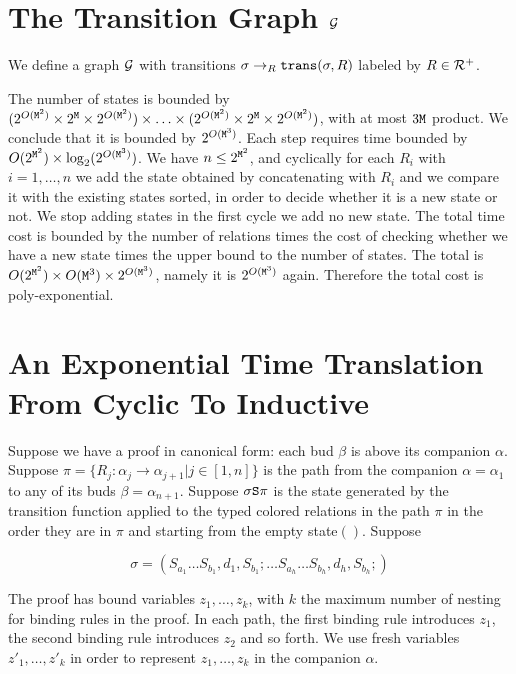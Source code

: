 \documentclass{lmcs}
\begin{document}
\section{The Transition Graph ${\mathcal G}$}
We define a graph ${\mathcal G}$ with transitions $\sigma \rightarrow_R {\tt trans}(\sigma,R)$ labeled
by $R \in {\mathcal R}^+$.


The number of states is bounded by 
$
(2^{O({\tt M}^2)} \times 2^{\tt M} \times 2^{O({\tt M}^2)})
\times \ldots \times
(2^{O({\tt M}^2)} \times 2^{\tt M} \times 2^{O({\tt M}^2)})
$,
with at most $3{\tt M}$ product. 
We conclude that it is bounded by $2^{O({\tt M}^3)}$. Each step requires time bounded by
$O(2^{{\tt M}^2}) \times \log_2(2^{O({\tt M}^3)})$. 
We have $n \le 2^{{\tt M}^2}$, and cyclically 
for each $R_i$ with $i = 1, \ldots, n$ we add the state obtained by concatenating with 
$R_i$ and we compare it with the existing states sorted, in order to decide whether it is a new
state or not. We stop adding states in the first cycle we add no new state.
The total time cost is bounded by the number of relations times the cost of checking
whether we have a new state times the upper bound to the number of states.
The total is $O(2^{{\tt M}^2}) \times {O({\tt M}^3)} \times 2^{O({\tt M}^3)}$,
namely it is $2^{O({\tt M}^3)}$ again. Therefore the total cost is poly-exponential.



\section{An Exponential Time Translation From Cyclic To Inductive}
Suppose we have a proof in canonical form: each bud $\beta$ is above its companion $\alpha$.
Suppose 
$\pi = \{R_j:\alpha_j \rightarrow \alpha_{j+1} | j \in [1,n]\}$ 
is the path from the companion $\alpha =\alpha_1$ to 
any of its buds $\beta = \alpha_{n+1}$. 
Suppose $\sigma {\tt S} \pi$ is the state generated by the transition
function applied to the typed colored relations in the path $\pi$ in the order they are in $\pi$
and starting from the empty state$()$. Suppose 

$$
\sigma = 
(
S_{a_1}\ldots S_{b_1}, d_1, S_{b_1};
\ldots
S_{a_h}\ldots S_{b_h}, d_h, S_{b_h};
)
$$

The proof has bound variables $z_1, \ldots, z_k$, with $k$ the maximum number
of nesting for binding rules in the proof. In each path, the first binding rule introduces $z_1$,
the second binding rule introduces $z_2$ and so forth.
We use fresh variables $z'_1, \ldots, z'_k$ in order to represent $z_1, \ldots, z_k$
in the companion $\alpha$.
\end{document}
